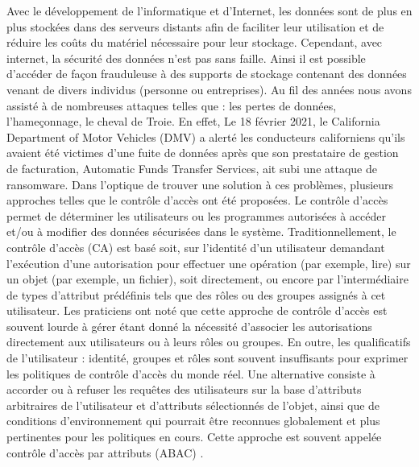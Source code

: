 

  Avec le développement de l'informatique et d'Internet, les données sont de plus en plus stockées dans des serveurs distants afin de faciliter leur utilisation et de réduire les coûts du matériel nécessaire pour leur stockage. Cependant, avec internet, la sécurité des données n'est pas sans faille. Ainsi il est possible d'accéder de façon frauduleuse à des supports de stockage contenant des données venant de divers individus (personne ou entreprises). Au fil des années nous avons assisté à de nombreuses attaques telles que : les pertes de données, l'hameçonnage, le cheval de Troie. En  effet, Le 18 février 2021, le California Department of Motor Vehicles (DMV) a alerté les conducteurs californiens qu'ils avaient été victimes d'une fuite de données après que son prestataire de gestion de facturation, Automatic Funds Transfer Services, ait subi une attaque de ransomware. Dans l'optique de trouver une solution à ces problèmes, plusieurs approches telles que le contrôle d'accès ont été proposées. Le contrôle d'accès  permet de déterminer les utilisateurs ou les programmes autorisées à accéder et/ou à modifier des données sécurisées dans le système. Traditionnellement, le contrôle d'accès (CA) est basé soit, sur l'identité d'un utilisateur demandant l'exécution d'une autorisation pour effectuer une opération (par exemple, lire) sur un objet (par exemple, un fichier), soit directement, ou encore par l'intermédiaire de types d'attribut prédéfinis tels que des rôles ou des groupes assignés à cet utilisateur. Les praticiens ont noté que cette approche de contrôle d'accès est souvent lourde à gérer étant donné la nécessité d'associer les autorisations directement aux utilisateurs ou à leurs rôles ou groupes. En outre, les qualificatifs de l'utilisateur : identité, groupes et rôles sont souvent insuffisants pour exprimer les politiques de contrôle d'accès du monde réel. Une alternative consiste à accorder ou à refuser les requêtes des utilisateurs sur la base d'attributs arbitraires de l'utilisateur et d'attributs sélectionnés de l'objet, ainsi que de conditions d'environnement qui pourrait être reconnues globalement et plus pertinentes pour les politiques en cours. Cette approche est souvent appelée contrôle d'accès par attributs (ABAC) \cite{Vin15}.

